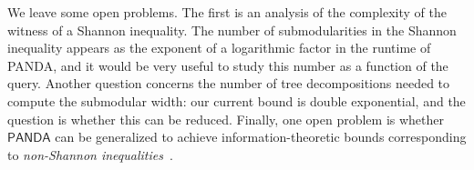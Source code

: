 \documentclass[10pt,a4paper]{article}
\newcommand{\panda}{\textsf{PANDA}\xspace}
\begin{document}
We leave some open problems.  The first is an analysis of the
complexity of the witness of a Shannon inequality.  The number of
submodularities in the Shannon inequality appears as the exponent
of a logarithmic factor in the runtime of \panda, and it would be very useful to
study this number as a function of the query.
Another question concerns the
number of tree decompositions needed to compute the submodular width:
our current bound is double exponential, and the question is whether
this can be reduced.  Finally, one open problem is whether $\panda$
can be generalized to achieve information-theoretic bounds
corresponding to {\em non-Shannon
  inequalities}~\cite{DBLP:journals/tit/ZhangY97,zhang1998characterization}.





\end{document}
